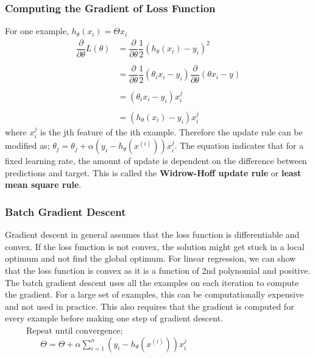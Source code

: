\documentclass[12pt,a4paper,titlepage,landscape]{book}
\begin{document}
	\subsubsection{Computing the Gradient of Loss Function}
	For one example, $h_\theta(x_i) = \Theta{x_i}$
	\begin{equation*}
	\begin{array}{cl}
	\dfrac{\partial}{\partial\theta}L(\theta) &= \dfrac{\partial}{\partial\theta} \dfrac{1}{2}\left(h_\theta(x_i) - y_i\right)^2 \\
	\\
	&= \dfrac{\partial}{\partial\theta} \dfrac{1}{2}\left(\theta_i{x_i} - y_i\right)\dfrac{\partial}{\partial\theta}\left(\theta{x_i - y}\right) \\\\
	&= \left(\theta_i{x_i} - y_i\right)x_i^j \\\\
	&= \left(h_\theta(x_i) - y_i\right)x_i^j
	\end{array}
	\end{equation*} where $x_i^j$ is the jth feature of the ith example. Therefore the update rule can be modified as;
	$\theta_j = \theta_{j} + \alpha(y_i - h_\theta(x^{(i)}))x_i^j$.
	The equation indicates that for a fixed learning rate, the amount of update is dependent on the difference between predictions and target. This is called the \textbf{Widrow-Hoff update rule} or \textbf{least mean square rule}.
	
	\subsubsection{Batch Gradient Descent}
	Gradient descent in general assumes that the loss function is differentiable and convex. If the loss function is not convex, the solution might get stuck in a local optimum and not find the global optimum. For linear regression, we can show that the loss function is convex as it is a function of 2nd polynomial and positive. \\ 
	The batch gradient descent uses all the examples on each iteration to compute the gradient. For a large set of examples, this can be computationally expensive and not used in practice. This also requires that the gradient is computed for every example before making one step of gradient descent. 
	\\
	${}\hspace{30pt} \text{Repeat until convergence;} $\\
	${}\hspace{50pt} \Theta = \Theta + \alpha\sum_{i=1}^{n}\left(y_i - h_\theta(x^{(i)})\right)x_i^j $
	
\end{document}
